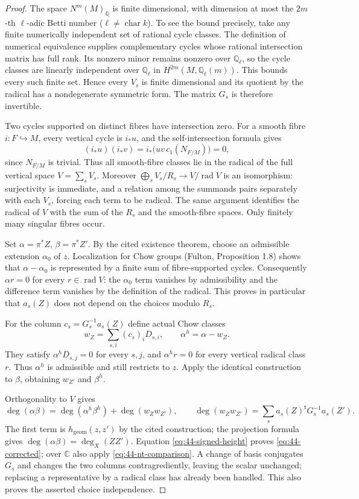 \begin{proof}
The space $N^m(M)_{\mathbb Q}$ is finite dimensional, with dimension
at most the $2m$-th $\ell$-adic Betti number
($\ell\ne\operatorname{char}k$).  To see the bound precisely, take
any finite numerically independent set of rational cycle classes.
The definition of numerical equivalence supplies complementary
cycles whose rational intersection matrix has full rank.  Its
nonzero minor remains nonzero over $\mathbb Q_\ell$, so the cycle
classes are linearly independent over $\mathbb Q_\ell$ in
$H^{2m}(M,\mathbb Q_\ell(m))$.  This bounds every such finite set.
Hence every $V_s$ is finite dimensional and its quotient by the
radical has a nondegenerate symmetric form.
The matrix $G_s$ is therefore invertible.

Two cycles supported on distinct fibres have intersection zero.
For a smooth fibre $i:F\hookrightarrow M$, every vertical cycle is
$i_*u$, and the self-intersection formula gives
\[
 (i_*u)(i_*v)=i_*\bigl(uv\,c_1(N_{F/M})\bigr)=0,
\]
since $N_{F/M}$ is trivial.  Thus all smooth-fibre classes lie in the
radical of the full vertical space $V=\sum_sV_s$.  Moreover
$\bigoplus_s V_s/R_s\to V/\operatorname{rad}V$ is an isomorphism:
surjectivity is immediate, and a relation among the summands pairs
separately with each $V_s$, forcing each term to be radical.  The same
argument identifies the radical of $V$ with the sum of the $R_s$ and
the smooth-fibre spaces.  Only finitely many singular fibres occur.

Set $\alpha=\pi^*Z$, $\beta=\pi^*Z'$.  By the cited existence theorem,
choose an admissible extension $\alpha_0$ of $z$.  Localization for Chow
groups (Fulton, Proposition 1.8) shows that
$\alpha-\alpha_0$ is represented by a finite sum of fibre-supported
cycles.  Consequently $\alpha r=0$ for every $r\in\operatorname{rad}V$:
the $\alpha_0$ term vanishes by admissibility and the difference term
vanishes by the definition of the radical.  This proves in particular
that $a_s(Z)$ does not depend on the choices modulo $R_s$.

For the column $c_s=G_s^{-1}a_s(Z)$ define actual Chow classes
\[
 w_Z=\sum_{s,i}(c_s)_iD_{s,i},\qquad
 \alpha^h=\alpha-w_Z.
\]
They satisfy $\alpha^h D_{s,j}=0$ for every $s,j$, and $\alpha^h r=0$
for every vertical radical class $r$.  Thus $\alpha^h$ is admissible
and still restricts to $z$.  Apply the identical construction to
$\beta$, obtaining $w_{Z'}$ and $\beta^h$.

Orthogonality to $V$ gives
\[
 \deg(\alpha\beta)=\deg(\alpha^h\beta^h)+\deg(w_Zw_{Z'}),\qquad
 \deg(w_Zw_{Z'})=\sum_s a_s(Z)^{\mathsf t}G_s^{-1}a_s(Z').
\]
The first term is $h_{\mathrm{geom}}(z,z')$ by the cited construction;
the projection formula gives $\deg(\alpha\beta)=\deg_X(ZZ')$.
Equation \eqref{eq:44-signed-height} proves
\eqref{eq:44-corrected}; over $\mathbb C$ also apply
\eqref{eq:44-nt-comparison}.  A change of basis conjugates $G_s$
and changes the two columns contragrediently, leaving the scalar
unchanged; replacing a representative by a radical class has already
been handled.  This also proves the asserted choice independence.
\end{proof}

